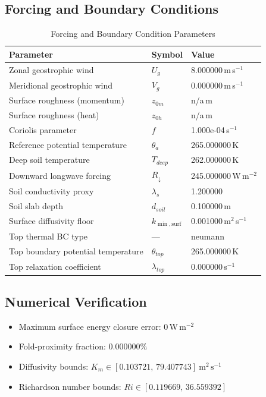 \subsection{Forcing and Boundary Conditions}
\begin{table}[htbp]
\centering
\caption{Forcing and Boundary Condition Parameters}
\label{tab:scm_parameters_gabls1_gabls1_80x2m_0h_report}
\begin{tabular}{lll}
\hline
{\bfseries Parameter} & {\bfseries Symbol} & {\bfseries Value} \\
\hline
Zonal geostrophic wind & $U_g$ & 8.000000\,m\,s$^{-1}$ \\
Meridional geostrophic wind & $V_g$ & 0.000000\,m\,s$^{-1}$ \\
Surface roughness (momentum) & $z_{0m}$ & n/a\,m \\
Surface roughness (heat) & $z_{0h}$ & n/a\,m \\
Coriolis parameter & $f$ & 1.000e-04\,s$^{-1}$ \\
Reference potential temperature & $\theta_a$ & 265.000000\,K \\
Deep soil temperature & $T_{deep}$ & 262.000000\,K \\
Downward longwave forcing & $R_{\downarrow}$ & 245.000000\,W\,m$^{-2}$ \\
Soil conductivity proxy & $\lambda_s$ & 1.200000 \\
Soil slab depth & $d_{soil}$ & 0.100000\,m \\
Surface diffusivity floor & $k_{\min,\mathrm{surf}}$ & 0.001000\,m$^2$\,s$^{-1}$ \\
Top thermal BC type & --- & neumann \\
Top boundary potential temperature & $\theta_{top}$ & 265.000000\,K \\
Top relaxation coefficient & $\lambda_{top}$ & 0.000000\,s$^{-1}$ \\
\hline
\end{tabular}
\end{table}

\subsection{Numerical Verification}
\begin{itemize}
  \item Maximum surface energy closure error:
  $0\,\mathrm{W\,m^{-2}}$
  \item Fold-proximity fraction:
  $0.000000\%$
  \item Diffusivity bounds:
  $K_m \in [0.103721,\,79.407743]~\mathrm{m^2\,s^{-1}}$
  \item Richardson number bounds:
  $Ri \in [0.119669,\,36.559392]$
\end{itemize}

